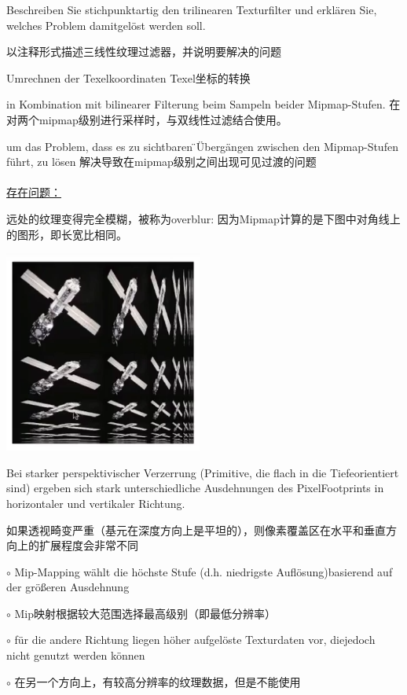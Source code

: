 \documentclass[fleqn]{article}
\begin{document}
Beschreiben  Sie  stichpunktartig  den  trilinearen  Texturfilter  und  erklären  Sie,  welches  Problem  damitgelöst werden soll.

以注释形式描述三线性纹理过滤器，并说明要解决的问题

Umrechnen der Texelkoordinaten Texel坐标的转换

in Kombination mit bilinearer Filterung beim Sampeln beider Mipmap-Stufen. 在对两个mipmap级别进行采样时，与双线性过滤结合使用。

um das Problem, dass es zu sichtbaren ̈Übergängen zwischen den Mipmap-Stufen führt, zu lösen 解决导致在mipmap级别之间出现可见过渡的问题
\\
\\
\underline{存在问题：}

远处的纹理变得完全模糊，被称为overblur: 因为Mipmap计算的是下图中对角线上的图形，即长宽比相同。

\begin{center}
    \includegraphics[scale=0.3]{27.png}
\end{center}

Bei starker perspektivischer Verzerrung (Primitive, die flach in die Tiefeorientiert sind) ergeben sich stark unterschiedliche Ausdehnungen des PixelFootprints in horizontaler und vertikaler Richtung.

如果透视畸变严重（基元在深度方向上是平坦的），则像素覆盖区在水平和垂直方向上的扩展程度会非常不同

$\circ$ Mip-Mapping wählt die höchste Stufe (d.h. niedrigste Auflösung)basierend auf der größeren Ausdehnung

$\circ$ Mip映射根据较大范围选择最高级别（即最低分辨率）

$\circ$ für die andere Richtung liegen höher aufgelöste Texturdaten vor, diejedoch nicht genutzt werden können

$\circ$ 在另一个方向上，有较高分辨率的纹理数据，但是不能使用
\end{document}
